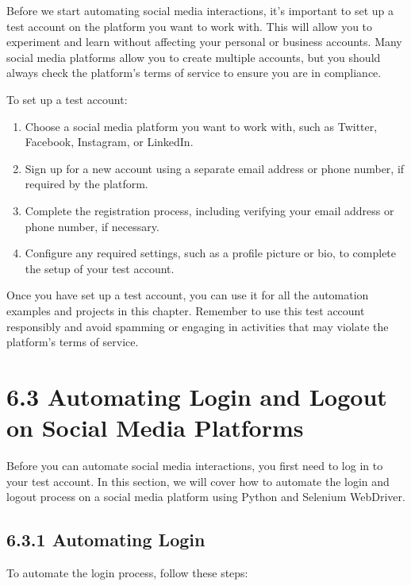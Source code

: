 \documentclass[
  paper=a4,
  ,captions=tableheading
]{scrartcl}
\providecommand{\tightlist}{%
  \setlength{\itemsep}{0pt}\setlength{\parskip}{0pt}}
\begin{document}
Before we start automating social media interactions, it's important to
set up a test account on the platform you want to work with. This will
allow you to experiment and learn without affecting your personal or
business accounts. Many social media platforms allow you to create
multiple accounts, but you should always check the platform's terms of
service to ensure you are in compliance.

To set up a test account:

\begin{enumerate}
\def\labelenumi{\arabic{enumi}.}
\tightlist
\item
  Choose a social media platform you want to work with, such as Twitter,
  Facebook, Instagram, or LinkedIn.
\item
  Sign up for a new account using a separate email address or phone
  number, if required by the platform.
\item
  Complete the registration process, including verifying your email
  address or phone number, if necessary.
\item
  Configure any required settings, such as a profile picture or bio, to
  complete the setup of your test account.
\end{enumerate}

Once you have set up a test account, you can use it for all the
automation examples and projects in this chapter. Remember to use this
test account responsibly and avoid spamming or engaging in activities
that may violate the platform's terms of service.

\hypertarget{automating-login-and-logout-on-social-media-platforms}{%
\section{6.3 Automating Login and Logout on Social Media
Platforms}\label{automating-login-and-logout-on-social-media-platforms}}

Before you can automate social media interactions, you first need to log
in to your test account. In this section, we will cover how to automate
the login and logout process on a social media platform using Python and
Selenium WebDriver.

\hypertarget{automating-login}{%
\subsection{6.3.1 Automating Login}\label{automating-login}}

To automate the login process, follow these steps:
\end{document}
